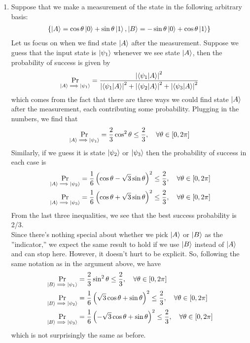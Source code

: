 \documentclass{article}
\theoremstyle{definition}
\newcommand{\f}[2]{\frac{#1}{#2}}
\newcommand{\lp}{\left(}
\newcommand{\rp}{\right)}
\begin{document}
\begin{enumerate}[label=(\alph*)]
	\item Suppose that we make a measurement of the state in the following arbitrary basis:
	\begin{align*}
		\{ \ket{A} = \cos\theta \ket{0} + \sin\theta \ket{1} , \ket{B} =  -\sin\theta\ket{0} + \cos\theta\ket{1}    \}
	\end{align*}
	Let us focus on when we find state $\ket{A}$ after the measurement. Suppose we guess that the input state is $\ket{\psi_1}$ whenever we see state $\ket{A}$, then the probability of success is given by
	\begin{align*}
		\Pr_{\ket{A}\implies \ket{\psi_1}} = \f{\abs{\bra{\psi_1} \ket{A}}^2}{\abs{\bra{\psi_1} \ket{A}}^2+\abs{\bra{\psi_2} \ket{A}}^2+\abs{\bra{\psi_3} \ket{A}}^2}
	\end{align*}
	which comes from the fact that there are three ways we could find state $\ket{A}$ after the measurement, each contributing some probability. Plugging in the numbers, we find that
	\begin{align*}
		\Pr_{\ket{A}\implies \ket{\psi_1}} = \f{2}{3}\cos^2\theta \leq \f{2}{3}, \quad \forall \theta \in [0,2\pi]
	\end{align*}
	Similarly, if we guess it is state $\ket{\psi_2}$ or $\ket{\psi_3}$ then the probability of success in each case is 
	\begin{align*}
		&\Pr_{\ket{A}\implies \ket{\psi_2}} = \f{1}{6}\lp\cos\theta - \sqrt{3}\sin\theta\rp^2 \leq \f{2}{3}, \quad \forall \theta \in [0,2\pi] \\
		&\Pr_{\ket{A}\implies \ket{\psi_3}} = \f{1}{6}\lp\cos\theta + \sqrt{3}\sin\theta\rp^2 \leq \f{2}{3}, \quad \forall \theta \in [0,2\pi] 
	\end{align*}
	From the last three inequalities, we see that the best success probability is 2/3. \\
	
	Since there's nothing special about whether we pick $\ket{A}$ or $\ket{B}$ as the ''indicator,'' we expect the same result to hold if we use $\ket{B}$ instead of $\ket{A}$ and can stop here. However, it doesn't hurt to be explicit. So, following the same notation as in the argument above, we have
	\begin{align*}
		&\Pr_{\ket{B}\implies \ket{\psi_1}} = \f{2}{3}\sin^2\theta \leq \f{2}{3}, \quad \forall \theta \in [0,2\pi]\\
		&\Pr_{\ket{B}\implies \ket{\psi_2}} = \f{1}{6}\lp\sqrt{3}\cos\theta + \sin\theta\rp^2 \leq \f{2}{3}, \quad \forall \theta \in [0,2\pi] \\
		&\Pr_{\ket{B}\implies \ket{\psi_3}} = \f{1}{6}\lp-\sqrt{3} \cos\theta + \sin\theta\rp^2 \leq \f{2}{3}, \quad \forall \theta \in [0,2\pi] 
	\end{align*}
	which is not surprisingly the same as before. \\
	

\end{enumerate}
\end{document}
